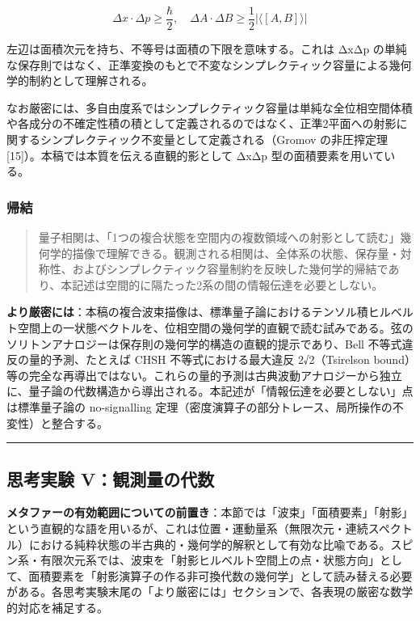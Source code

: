 \documentclass[
]{ltjsarticle}
\begin{document}
\[\Delta x \cdot \Delta p \geq \frac{\hbar}{2}, \quad \Delta A \cdot \Delta B \geq \frac{1}{2}\left|\langle [A,B] \rangle\right|\]

左辺は面積次元を持ち、不等号は面積の下限を意味する。これは ΔxΔp
の単純な保存則ではなく、正準変換のもとで不変なシンプレクティック容量による幾何学的制約として理解される。

なお厳密には、多自由度系ではシンプレクティック容量は単純な全位相空間体積や各成分の不確定性積の積として定義されるのではなく、正準2平面への射影に関するシンプレクティック不変量として定義される（Gromov
の非圧搾定理 {[}15{]}）。本稿では本質を伝える直観的影として ΔxΔp
型の面積要素を用いている。

\subsubsection{帰結}\label{ux5e30ux7d50-3}

\begin{quote}
量子相関は、「1つの複合状態を空間内の複数領域への射影として読む」幾何学的描像で理解できる。観測される相関は、全体系の状態、保存量・対称性、およびシンプレクティック容量制約を反映した幾何学的帰結であり、本記述は空間的に隔たった2系の間の情報伝達を必要としない。
\end{quote}

\textbf{より厳密には}：本稿の複合波束描像は、標準量子論におけるテンソル積ヒルベルト空間上の一状態ベクトルを、位相空間の幾何学的直観で読む試みである。弦のソリトンアナロジーは保存則の幾何学的構造の直観的提示であり、Bell
不等式違反の量的予測、たとえば CHSH 不等式における最大違反
2√2（Tsirelson
bound）等の完全な再導出ではない。これらの量的予測は古典波動アナロジーから独立に、量子論の代数構造から導出される。本記述が「情報伝達を必要としない」点は標準量子論の
no-signalling
定理（密度演算子の部分トレース、局所操作の不変性）と整合する。

\begin{center}\rule{0.5\linewidth}{0.5pt}\end{center}

\subsection{思考実験
V：観測量の代数}\label{ux601dux8003ux5b9fux9a13-vux89b3ux6e2cux91cfux306eux4ee3ux6570}

\textbf{メタファーの有効範囲についての前置き}：本節では「波束」「面積要素」「射影」という直観的な語を用いるが、これは位置・運動量系（無限次元・連続スペクトル）における純粋状態の半古典的・幾何学的解釈として有効な比喩である。スピン系・有限次元系では、波束を「射影ヒルベルト空間上の点・状態方向」として、面積要素を「射影演算子の作る非可換代数の幾何学」として読み替える必要がある。各思考実験末尾の「より厳密には」セクションで、各表現の厳密な数学的対応を補足する。
\end{document}
